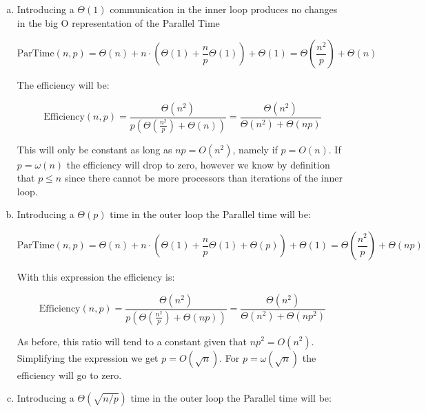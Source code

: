 \documentclass[a4paper]{article}
\begin{document}
    \begin{enumerate}[a)]
        \item Introducing a $\Theta(1)$ communication in the inner loop produces no changes in the big O representation of the Parallel Time
        
        \begin{equation}
            \text{ParTime}(n,p) = \Theta(n) + n\cdot \left(\Theta(1) + \frac{n}{p}\Theta(1) \right) + \Theta(1) = \Theta \left(\frac{n^2}{p}\right) + \Theta(n)
        \end{equation}

        The efficiency will be:

        \begin{equation}
            \text{Efficiency}(n,p) = \frac{\Theta(n^2)}{p \left( \Theta \left(\frac{n^2}{p}\right) + \Theta(n) \right)} = \frac{\Theta(n^2)}{\Theta(n^2)+  \Theta(n p)}
        \end{equation}

        This will only be constant as long as $ np = O(n^2)$, namely if $p = O(n)$. If $p = \omega(n)$ the efficiency will drop to zero, however we know by definition that $p \leq n$ since there cannot be more processors than iterations of the inner loop.

        \item Introducing a $\Theta(p)$ time in the outer loop the Parallel time will be:

        \begin{equation}
            \text{ParTime}(n,p) = \Theta(n) + n\cdot \left(\Theta(1) + \frac{n}{p}\Theta(1) + \Theta(p) \right) + \Theta(1) = \Theta \left(\frac{n^2}{p}\right) + \Theta(n p)
        \end{equation}

        With this expression the efficiency is:

        \begin{equation}
            \text{Efficiency}(n,p) = \frac{\Theta(n^2)}{p \left(\Theta \left(\frac{n^2}{p}\right) + \Theta(n p) \right)} = \frac{\Theta(n^2)}{\Theta(n^2)+  \Theta(n p^2)}
        \end{equation}

        As before, this ratio will tend to a constant given that $n p^2 = O(n^2)$. Simplifying the expression we get $p = O(\sqrt{n})$. For $p = \omega(\sqrt{n})$ the efficiency will go to zero.

        \item  Introducing a $\Theta(\sqrt{n/p})$ time in the outer loop the Parallel time will be:


\end{enumerate}
\end{document}
